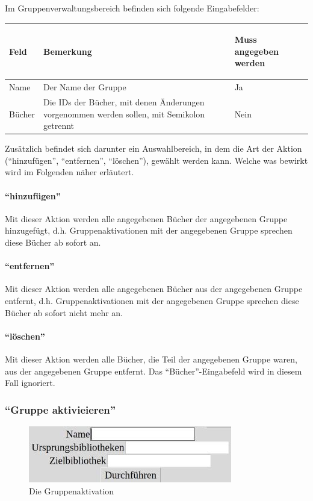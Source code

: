 Im Gruppenverwaltungsbereich befinden sich folgende Eingabefelder:

\begin{tabular}{|p{}|p{}|p{}|}\hline
\begin{center}Feld\end{center} & \begin{center}Bemerkung\end{center} & \begin{center}Muss angegeben werden\end{center}\\
\hline
Name & Der Name der Gruppe & Ja\\
\hline
Bücher & Die IDs der Bücher, mit denen Änderungen vorgenommen werden sollen, mit Semikolon getrennt & Nein\\
\hline
\end{tabular}

Zusätzlich befindet sich darunter ein Auswahlbereich, in dem die Art der Aktion (``hinzufügen'', ``entfernen'', ``löschen''), gewählt werden kann. Welche was bewirkt wird im Folgenden näher erläutert.

\paragraph{``hinzufügen''}
Mit dieser Aktion werden alle angegebenen Bücher der angegebenen Gruppe hinzugefügt, d.h. Gruppenaktivationen mit der angegebenen Gruppe sprechen diese Bücher ab sofort an.

\paragraph{``entfernen''}
Mit dieser Aktion werden alle angegebenen Bücher aus der angegebenen Gruppe entfernt, d.h. Gruppenaktivationen mit der angegebenen Gruppe sprechen diese Bücher ab sofort nicht mehr an.

\paragraph{``löschen''}
Mit dieser Aktion werden alle Bücher, die Teil der angegebenen Gruppe waren, aus der angegebenen Gruppe entfernt. Das ``Bücher''-Eingabefeld wird in diesem Fall ignoriert.


\subsubsection{``Gruppe aktivieieren''}
\label{subsubsec:detail:edit:activate_group}
\begin{figure}\includegraphics{images/gui2/activate_group.jpg}\caption{Die Gruppenaktivation}\label{fig:activate_group}\end{figure}

